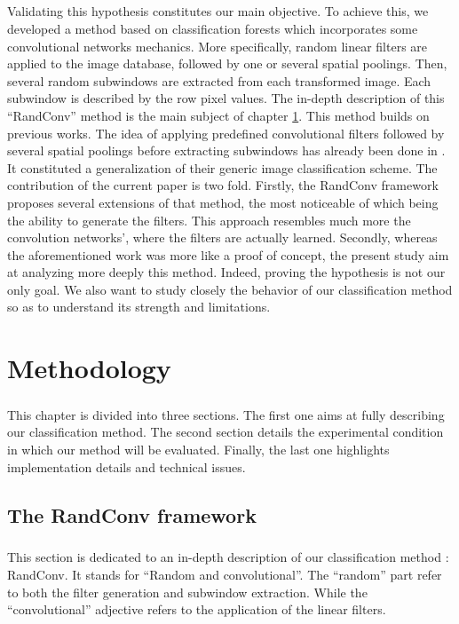 \documentclass[a4paper]{report}
\begin{document}
\paragraph{}
Validating this hypothesis constitutes our main objective. To achieve this, we developed a method based on classification forests which incorporates some convolutional networks mechanics. More specifically, random linear filters are applied to the image database, followed by one or several spatial poolings. Then, several random subwindows are extracted from each transformed image. Each subwindow is described by the row pixel values.
The in-depth description of this ``RandConv'' method is the main subject of chapter \ref{chap:methodo}.
	This method builds on previous works. The idea of applying predefined convolutional filters followed by several spatial poolings before extracting subwindows has already been done in \cite{}. It constituted a generalization of their generic image classification scheme. %
	The contribution of the current paper is two fold. 
	Firstly, the RandConv framework proposes several extensions of that method, the most noticeable of which being the ability to generate the filters. This approach resembles much more the convolution networks', where the filters are actually learned.
	Secondly, whereas the aforementioned work was more like a proof of concept, the present study aim at analyzing more deeply this method. Indeed, proving the hypothesis is not our only goal. We also want to study closely the behavior of our classification method so as to understand its strength and limitations.

\chapter{Methodology}
\label{chap:methodo}
\paragraph{}
This chapter is divided into three sections. The first one aims at fully describing our classification method. The second section details the experimental condition in which our method will be evaluated. Finally, the last one highlights implementation details and technical issues.
	\section{The RandConv framework}
	\paragraph{}
	This section is dedicated to an in-depth description of our classification method : RandConv. It stands for ``Random and 	convolutional''. The ``random'' part refer to both the filter generation and subwindow extraction. While the ``convolutional'' adjective refers to the application of the linear filters. 
\end{document}
